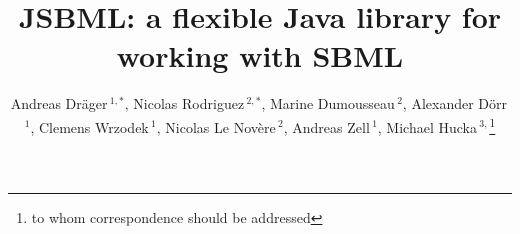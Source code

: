 \documentclass{bioinfo}
\begin{document}
\application
\title[JSBML: The Java library for SBML]{JSBML: a flexible Java library
for working with SBML} \author[Dr\"ager \textit{et~al.}]{Andreas
Dr\"ager\,$^{1,*}$,
Nicolas Rodriguez\,$^{2,*}$,
Marine Dumousseau\,$^{2}$,
Alexander D\"orr\,$^{1}$,
Clemens Wrzodek\,$^{1}$,
Nicolas Le Nov\`{e}re\,$^{2}$,
Andreas Zell\,$^{1}$,
Michael Hucka\,$^{3,}$\footnote{to whom correspondence should be addressed}}
\address{$^{1}$Center for Bioinformatics Tuebingen, University of Tuebingen, T\"ubingen, Germany.\\
$^{2}$European Bioinformatics Institute, Wellcome Trust Genome Campus, Hinxton, Cambridge, UK\\
$^{3}$Computing and Mathematical Sciences, California Institute of Technology, Pasadena, CA, USA}



\maketitle
\end{document}
